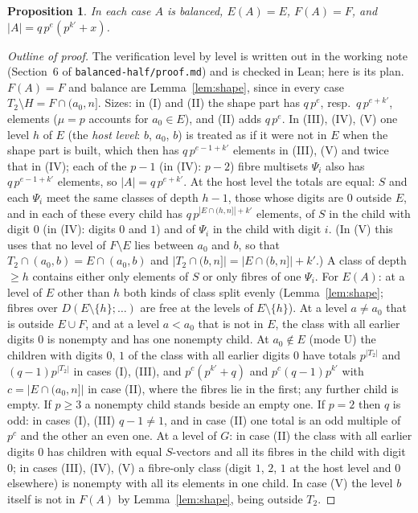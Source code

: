 \documentclass[11pt,a4paper]{amsart}
\newtheorem{proposition}[theorem]{Proposition}
\theoremstyle{definition}
\theoremstyle{remark}
\begin{document}
\begin{proposition}\label{prop:CB}
In each case $A$ is balanced, $E(A)=E$, $F(A)=F$, and $|A|=q\,p^{e}(p^{k'}+x)$.
\end{proposition}
\begin{proof}[Outline of proof]
The verification level by level is written out in the working note (Section~6 of
\texttt{balanced-half/proof.md}) and is checked in Lean; here is its plan. $F(A)=F$ and balance are Lemma~\ref{lem:shape}, since in every case $T_2\setminus H=F\cap(a_0,n]$. Sizes: in
(I) and (II) the shape part has $q\,p^{e}$, resp.\ $q\,p^{e+k'}$, elements ($\mu=p$ accounts for $a_0\in E$),
and (II) adds $q\,p^e$. In (III), (IV), (V) one level $h$ of $E$ (the \emph{host level}: $b$, $a_0$, $b$) is
treated as if it were not in $E$ when the shape part is built, which then has $q\,p^{e-1+k'}$ elements in
(III), (V) and twice that in (IV); each of the $p-1$ (in (IV): $p-2$) fibre multisets $\Psi_i$ also has $q\,p^{e-1+k'}$ elements, so
$|A|=q\,p^{e+k'}$. At the host level the totals are equal: $S$ and each $\Psi_i$ meet the same classes
of depth $h-1$, those whose digits are $0$ outside $E$, and in each of these every child has
$q\,p^{|E\cap(h,n]|+k'}$ elements, of $S$ in the child with digit $0$ (in (IV): digits $0$ and $1$) and
of $\Psi_i$ in the child with digit $i$. (In (V) this uses that no level of $F\setminus E$ lies between
$a_0$ and $b$, so that $T_2\cap(a_0,b)=E\cap(a_0,b)$ and $|T_2\cap(b,n]|=|E\cap(b,n]|+k'$.) A class of depth $\ge h$ contains either only elements of $S$ or only fibres of
one $\Psi_i$. For $E(A)$: at a level of $E$ other than $h$ both kinds of class split evenly
(Lemma~\ref{lem:shape}; fibres over $D(E\setminus\{h\};\dots)$ are free at the levels of $E\setminus\{h\}$).
At a level $a\ne a_0$ that is outside $E\cup F$, and at a level $a<a_0$ that is not in $E$, the class
with all earlier digits $0$ is nonempty and has one nonempty child. At $a_0\notin E$ (mode U) the children with digits $0$, $1$ of the class with all earlier digits $0$ have totals
$p^{|T_2|}$ and $(q-1)p^{|T_2|}$ in cases (I), (III), and $p^{c}(p^{k'}+q)$ and $p^{c}(q-1)p^{k'}$ with
$c=|E\cap(a_0,n]|$ in case (II), where the fibres lie in the first; any further child is empty. If $p\ge3$ a
nonempty child stands beside an empty one. If $p=2$ then $q$ is odd: in cases (I), (III) $q-1\ne1$, and in case
(II) one total is an odd multiple of $p^c$ and the other an even one.
At a level of $G$: in case (II) the class with all earlier digits $0$ has children with equal $S$-vectors
and all its fibres in the child with digit $0$; in cases (III), (IV), (V) a fibre-only class (digit $1$, $2$,
$1$ at the host level and $0$ elsewhere) is nonempty with all its elements in one child. In case (V) the
level $b$ itself is not in $F(A)$ by Lemma~\ref{lem:shape}, being outside $T_2$.
\end{proof}
\end{document}
